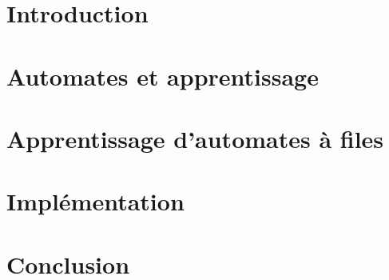 

\newcommand{\student}{Benjamin André}
\newcommand{\grade}{MAB2 Sciences Informatiques}
\newcommand{\director}{Véronique Bruyère}
\renewcommand{\title}{Vérification de la sûreté d'automates à file par apprentissage actif}
\renewcommand{\date}{\today}



	

	
	\tableofcontents
	\newpage




	\chapter{Introduction}\label{intro}
	\chapter{Automates et apprentissage}\label{pre}
	\chapter{Apprentissage d'automates à files}\label{pro}
	\chapter{Implémentation}\label{impl}
	\chapter{Conclusion}\label{ccl}

